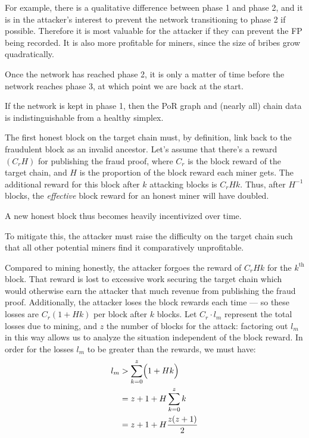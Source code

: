 For example, there is a qualitative difference between phase 1 and phase 2, and it is in the attacker's interest to prevent the network transitioning to phase 2 if possible.
Therefore it is most valuable for the attacker if they can prevent the FP being recorded.
It is also more profitable for miners, since the size of bribes grow quadratically.

Once the network has reached phase 2, it is only a matter of time before the network reaches phase 3, at which point we are back at the start.

If the network is kept in phase 1, then the PoR graph and (nearly all) chain data is indistinguishable from a healthy simplex.




The first honest block on the target chain must, by definition, link back to the fraudulent block as an invalid ancestor.
Let’s assume that there’s a reward $(C_r H)$ for publishing the fraud proof, where $C_r$ is the
block reward of the target chain, and $H$ is the proportion of the block reward each miner gets.
The additional reward for this block after $k$ attacking blocks is $C_r H k$.
Thus, after $H^{-1}$ blocks, the \emph{effective} block reward for an honest miner will have doubled.

A new honest block thus becomes heavily incentivized over time.

To mitigate this, the attacker must raise the difficulty on the target chain such that all other potential miners find it comparatively unprofitable.

Compared to mining honestly, the attacker forgoes the reward of $C_r H k$ for the $k^{\text{th}}$ block.
That reward is lost to excessive work securing the target chain which would otherwise earn the attacker that much revenue from publishing the fraud proof.
Additionally, the attacker loses the block rewards each time --- so these losses are $C_r (1 + H k)$ per block after $k$ blocks.
Let $C_r \cdot l_m$ represent the total losses due to mining, and $z$ the number of blocks for the attack: factoring out $l_m$ in this way allows us to analyze the situation independent of the block reward.
In order for the losses $l_m$ to be greater than the rewards, we must have:
\begin{align}
    l_m &> \sum\limits_{k=0}^z \Bigl( 1 + H k \Bigr) \nonumber \\
    &= z + 1 + H \sum\limits_{k=0}^z k \nonumber \\
    &= z + 1 + H \frac{z (z + 1)}{2}
    \label{eq:spv-atk-losses-mining}
\end{align}

